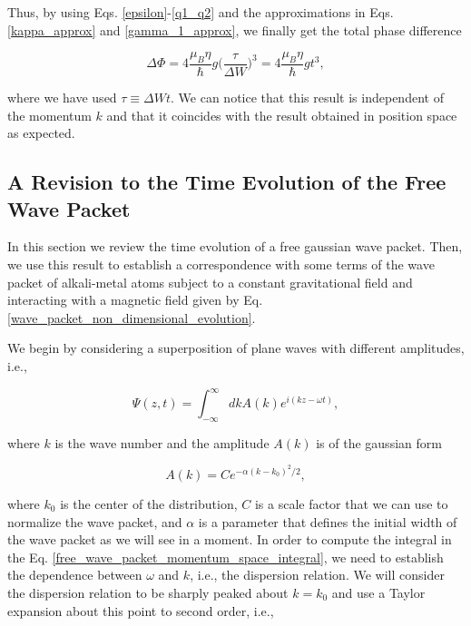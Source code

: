 \documentclass{article}
\begin{document}
Thus, by using Eqs. \ref{epsilon}-\ref{q1_q2} and the approximations in Eqs. \ref{kappa_approx} and \ref{gamma_1_approx}, we finally get the total phase difference

\begin{equation}\label{quantum_gravimetry_signal_momentum_space}
\Delta \Phi = 4 \frac{\mu_{B} \eta }{\hbar} g \bigg(\frac{\tau}{\Delta W}\bigg)^{3} = 4 \frac{\mu_{B} \eta }{\hbar} g t^{3},
\end{equation}

where we have used $\tau\equiv \Delta W t$. We can notice that this result is independent of the momentum $k$ and that it coincides with the result obtained in position space as expected.

\subsection{A Revision to the Time Evolution of the Free Wave Packet}
In this section we review the time evolution of a free gaussian wave packet. Then, we use this result to establish a correspondence with some terms of the wave packet of alkali-metal atoms subject to a constant gravitational field and interacting with a magnetic field given by Eq. \ref{wave_packet_non_dimensional_evolution}.

We begin by considering a superposition of plane waves with different amplitudes, i.e.,

\begin{equation}\label{free_wave_packet_momentum_space_integral}
    \Psi (z, t) =  \int_{- \infty}^{\infty} dk A(k) e^{i (kz-\omega t)} ,
\end{equation}

where $k$ is the wave number and the amplitude $A(k)$ is of the gaussian form

\begin{equation}\label{gaussian_amplitude_free_wave_packet}
    A(k) = C e^{-\alpha(k-k_{0})^{2}/2} ,
\end{equation}

where $k_{0}$ is the center of the distribution, $C$ is a scale factor that we can use to normalize the wave packet, and $\alpha$ is a parameter that defines the initial width of the wave packet as we will see in a moment. In order to compute the integral in the Eq. \ref{free_wave_packet_momentum_space_integral}, we need to establish the dependence between $\omega$ and $k$, i.e., the dispersion relation. We will consider the dispersion relation to be sharply peaked about $k=k_{0}$ and use a Taylor expansion about this point to second order, i.e.,
\end{document}
